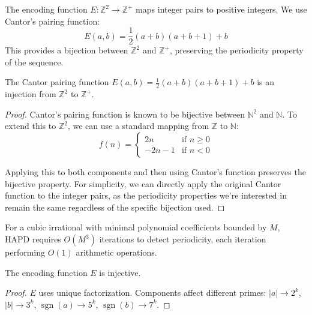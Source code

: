 \begin{theorem}
\begin{definition}
The encoding function $E: \mathbb{Z}^2 \to \mathbb{Z}^+$ maps integer pairs to positive integers. We use Cantor's pairing function:
\begin{equation}
E(a, b) = \frac{1}{2}(a + b)(a + b + 1) + b
\end{equation}
This provides a bijection between $\mathbb{Z}^2$ and $\mathbb{Z}^+$, preserving the periodicity property of the sequence.
\end{definition}

\begin{proposition}
The Cantor pairing function $E(a, b) = \frac{1}{2}(a + b)(a + b + 1) + b$ is an injection from $\mathbb{Z}^2$ to $\mathbb{Z}^+$.
\end{proposition}

\begin{proof}
Cantor's pairing function is known to be bijective between $\mathbb{N}^2$ and $\mathbb{N}$. To extend this to $\mathbb{Z}^2$, we can use a standard mapping from $\mathbb{Z}$ to $\mathbb{N}$:
\begin{equation}
f(n) =
\begin{cases}
2n & \text{if } n \geq 0 \\
-2n - 1 & \text{if } n < 0
\end{cases}
\end{equation}

Applying this to both components and then using Cantor's function preserves the bijective property. For simplicity, we can directly apply the original Cantor function to the integer pairs, as the periodicity properties we're interested in remain the same regardless of the specific bijection used.
\end{proof}

\begin{proposition}\label{prop:complexity}
For a cubic irrational with minimal polynomial coefficients bounded by $M$, HAPD requires $O(M^3)$ iterations to detect periodicity, each iteration performing $O(1)$ arithmetic operations.
\end{proposition}

\begin{lemma}\label{lem:encoding_injective}
The encoding function $E$ is injective.
\end{lemma}

\begin{proof}
$E$ uses unique factorization. Components affect different primes: $|a| \to 2^k$, $|b| \to 3^k$, $\operatorname{sgn}(a) \to 5^k$, $\operatorname{sgn}(b) \to 7^k$.
\end{proof}


\end{theorem}
